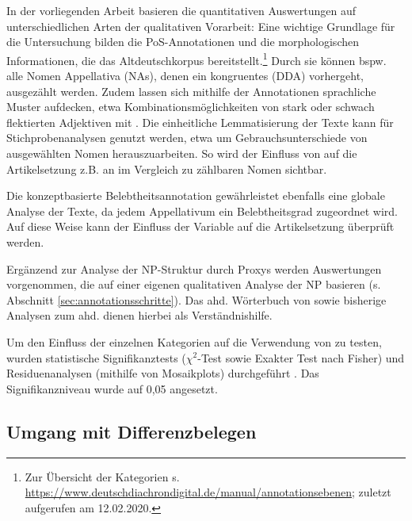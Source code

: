 In der vorliegenden Arbeit basieren die quantitativen Auswertungen auf unterschiedlichen Arten der qualitativen Vorarbeit:
Eine wichtige Grundlage für die Untersuchung bilden die PoS-Annotationen  und die morphologischen Informationen, die das Altdeutschkorpus  bereitstellt.\footnote{Zur Übersicht der Kategorien s. \url{https://www.deutschdiachrondigital.de/manual/annotationsebenen}; zuletzt aufgerufen am 12.02.2020.} Durch sie können bspw. alle Nomen Appellativa  (NAs), denen ein kongruentes   (DDA) vorhergeht, ausgezählt werden.
Zudem lassen sich mithilfe der Annotationen  sprachliche Muster aufdecken, etwa Kombinationsmöglichkeiten von stark oder schwach flektierten Adjektiven mit . Die einheitliche  Lemmatisierung der Texte kann für Stichprobenanalysen genutzt werden, etwa um Gebrauchsunterschiede von ausgewählten Nomen  herauszuarbeiten. So wird der Einfluss von  auf die Artikelsetzung z.B. an  im Vergleich zu zählbaren Nomen sichtbar.

Die konzeptbasierte Belebtheitsannotation gewährleistet ebenfalls eine globale Analyse der Texte, da jedem Appellativum  ein Belebtheitsgrad  zugeordnet wird. Auf diese Weise kann der Einfluss der Variable  auf die Artikelsetzung überprüft werden. 

Ergänzend zur Analyse der NP-Struktur durch Proxys  werden Auswertungen vorgenommen, die auf einer eigenen qualitativen Analyse der NP  basieren (s. Abschnitt \ref{sec:annotationsschritte}). Das ahd. Wörterbuch von \textcite{Schutzeichel2012} sowie bisherige Analysen zum ahd.  \parencite[v.a.][]{Oubouzar1989} dienen hierbei als Verständnishilfe.  

Um den Einfluss der einzelnen Kategorien auf die Verwendung von  zu testen, wurden statistische Signifikanztests ($\chi^2$-Test sowie Exakter Test nach Fisher) und Residuenanalysen (mithilfe von Mosaikplots) durchgeführt \parencite{Gries2012}. Das Signifikanzniveau wurde auf 0,05 angesetzt.

\subsection{Umgang mit Differenzbelegen}\label{sec:differenz}

